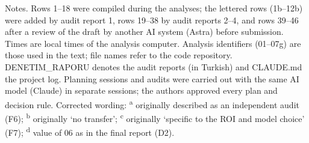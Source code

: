 \vspace{-0.5\baselineskip}
{\scriptsize\noindent Notes. Rows 1--18 were compiled during the analyses; the lettered rows (1b--12b) were added by audit report 1, rows 19--38 by audit reports 2--4, and rows 39--46 after a review of the draft by another AI system (Astra) before submission. Times are local times of the analysis computer. Analysis identifiers (01--07g) are those used in the text; file names refer to the code repository. DENETIM\_\allowbreak{}RAPORU denotes the audit reports (in Turkish) and CLAUDE.md the project log. Planning sessions and audits were carried out with the same AI model (Claude) in separate sessions; the authors approved every plan and decision rule. Corrected wording: \textsuperscript{a} originally described as an independent audit (F6); \textsuperscript{b} originally `no transfer'; \textsuperscript{c} originally `specific to the ROI and model choice' (F7); \textsuperscript{d} value of 06 as in the final report (D2).\par}
\endgroup
